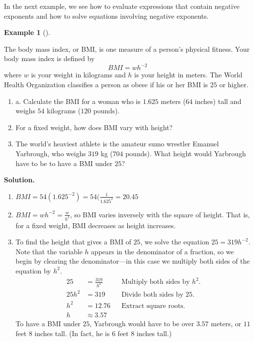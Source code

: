 \documentclass[10pt,]{book}
\theoremstyle{plain}
\theoremstyle{definition}
\theoremstyle{definition}
\theoremstyle{definition}
\newtheorem{example}[theorem]{Example}
\theoremstyle{definition}
\theoremstyle{definition}
\numberwithin{equation}{section}
\newcommand{\amp}{ & }
\begin{document}
    In the next example, we see how to evaluate expressions that contain negative exponents and how to solve equations involving negative exponents.
%
\begin{example}[]\label{example-BMI-index}

    The body mass index, or BMI, is one measure of a person’s physical fitness. Your body mass index is defined by
    \begin{equation*}BMI = wh^{−2}\end{equation*}
    where \(w\) is your weight in kilograms and \(h\) is your height in meters. The World Health Organization classifies a person as obese if his or her BMI is \(25\) or higher.
%
\leavevmode%
\begin{enumerate}[label=*\alph**]
\item\hypertarget{li-422}{}a. Calculate the BMI for a woman who is \(1.625\) meters (\(64\) inches) tall and weighs \(54\) kilograms (\(120\) pounds).\item\hypertarget{li-423}{}For a fixed weight, how does BMI vary with height?\item\hypertarget{li-424}{}The world’s heaviest athlete is the amateur sumo wrestler Emanuel Yarbrough, who weighs \(319\) kg (\(704\) pounds). What height would Yarbrough have to be to have a BMI under \(25\)?\end{enumerate}
\par\medskip\noindent%
\textbf{Solution.}\quad \leavevmode%
\begin{enumerate}[label=*\alph**]
\item\hypertarget{li-425}{}\(BMI = 54(1.625^{−2})= 54(\frac{1}{1.625^2}= 20.45\)\item\hypertarget{li-426}{}\(BMI = wh^{−2} = \frac{w}{h^2}\), so BMI varies inversely with the square of height. That is, for a fixed weight, BMI decreases as height increases.\item\hypertarget{li-427}{}To find the height that gives a BMI of \(25\), we solve the equation \(25 = 319h^{−2}\). Note that the variable \(h\) appears in the denominator of a fraction, so we begin by clearing the denominator—in this case we multiply both sides of the equation by \(h^2\).
    \begin{align*}
    25 \amp = \frac{319}{h^2} \amp\amp \text{Multiply both sides by }h^2.\\
    25h^2 \amp = 319 \amp\amp \text{Divide both sides by }25.\\
    h^2 \amp = 12.76 \amp\amp \text{Extract square roots.}\\ 
    h \amp\approx 3.57
    \end{align*}
    To have a BMI under \(25\), Yarbrough would have to be over \(3.57\) meters, or \(11\) feet \(8\) inches tall. (In fact, he is \(6\) feet \(8\) inches tall.)\end{enumerate}

%
\end{example}
\end{document}
